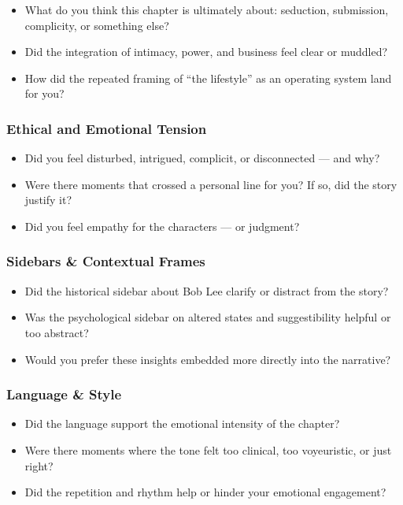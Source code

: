 \begin{itemize}
  \item What do you think this chapter is ultimately about: seduction, submission, complicity, or something else?
  \item Did the integration of intimacy, power, and business feel clear or muddled?
  \item How did the repeated framing of “the lifestyle” as an operating system land for you?
\end{itemize}

\subsubsection{Ethical and Emotional Tension}

\begin{itemize}
  \item Did you feel disturbed, intrigued, complicit, or disconnected — and why?
  \item Were there moments that crossed a personal line for you? If so, did the story justify it?
  \item Did you feel empathy for the characters — or judgment?
\end{itemize}

\subsubsection{Sidebars \& Contextual Frames}

\begin{itemize}
  \item Did the historical sidebar about Bob Lee clarify or distract from the story?
  \item Was the psychological sidebar on altered states and suggestibility helpful or too abstract?
  \item Would you prefer these insights embedded more directly into the narrative?
\end{itemize}

\subsubsection{Language \& Style}

\begin{itemize}
  \item Did the language support the emotional intensity of the chapter?
  \item Were there moments where the tone felt too clinical, too voyeuristic, or just right?
  \item Did the repetition and rhythm help or hinder your emotional engagement?
\end{itemize}

